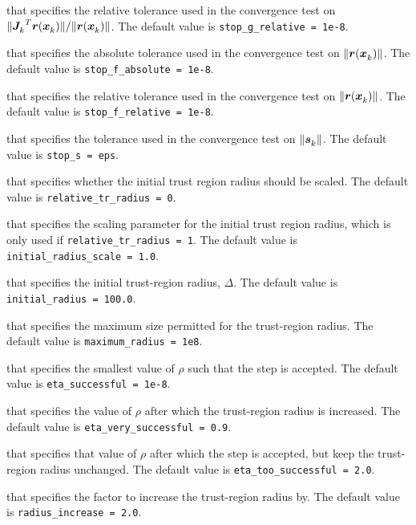 \begin{description}
that specifies the relative tolerance used in the convergence test on \(\|{{\bm J}_{k}^{}}^T{\bm r}({\bm x}_{k}^{})\|/\|{\bm r}({\bm x}_{k}^{})\|\).
The default value is {\tt stop\_g\_relative = 1e{-8}}.

that specifies the absolute tolerance used in the convergence test on \(\|{\bm r}({\bm x}_{k}^{})\|\).
The default value is {\tt stop\_f\_absolute = 1e{-8}}.

that specifies the relative tolerance used in the convergence test on \(\|{\bm r}({\bm x}_{k}^{})\|\).
The default value is {\tt stop\_f\_relative = 1e{-8}}.

that specifies the tolerance used in the convergence test on \(\|{\bm s}_{k}^{}\|\).
The default value is {\tt stop\_s = eps}.

that specifies whether the initial trust region radius should be scaled.
The default value is {\tt relative\_tr\_radius = 0}.

that specifies the scaling parameter for the initial trust region radius, which is only used if {\tt relative\_tr\_radius = 1}.
The default value is {\tt initial\_radius\_scale = 1.0}.

that specifies the initial trust-region radius, $\Delta$.
The default value is {\tt initial\_radius = 100.0}.

that specifies the maximum size permitted for the trust-region radius.
The default value is {\tt maximum\_radius = 1e8}.

that specifies the smallest value of $\rho$ such that the step is accepted.
The default value is {\tt eta\_successful = 1e-8}.


that specifies the value of $\rho$ after which the trust-region radius is increased.
The default value is {\tt eta\_very\_successful = 0.9}.

that specifies that value of $\rho$ after which the step is accepted, but keep the trust-region radius unchanged.
The default value is {\tt eta\_too\_successful = 2.0}.

that specifies the factor to increase the trust-region radius by.
The default value is {\tt radius\_increase = 2.0}.


\end{description}
